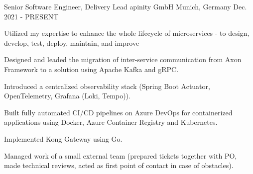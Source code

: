 

\begin{cventries}

    \cventry
    {Senior Software Engineer, Delivery Lead} %
    {apinity GmbH} %
    {Munich, Germany} %
    {Dec. 2021 - PRESENT} %
    {
        \begin{cvitems} %
            \item {Utilized my expertise to enhance the whole lifecycle of microservices - to design, develop, test, deploy, maintain, and improve}
            \item {Designed and leaded the migration of inter-service communication from Axon Framework to a solution using Apache Kafka and gRPC.}
            \item {Introduced a centralized observability stack (Spring Boot Actuator, OpenTelemetry, Grafana (Loki, Tempo)).}
            \item {Built fully automated CI/CD pipelines on Azure DevOps for containerized applications using Docker, Azure Container Registry and Kubernetes.}
            \item {Implemented Kong Gateway using Go.}
            \item {Managed work of a small external team (prepared tickets together with PO, made technical reviews, acted as first point of contact in case of obstacles).}
        \end{cvitems}
    }


\end{cventries}
